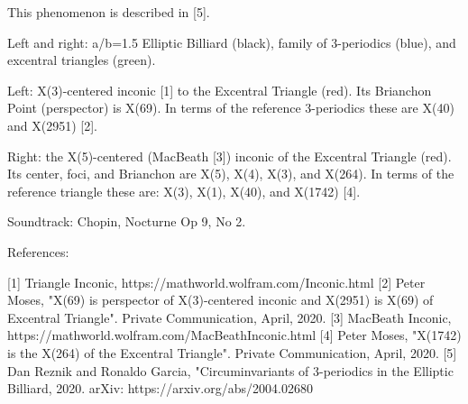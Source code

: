 This phenomenon is described in [5].

Left and right: a/b=1.5 Elliptic Billiard (black), family of 3-periodics (blue), and excentral triangles (green).

Left: X(3)-centered inconic [1] to the Excentral Triangle (red). Its Brianchon Point (perspector) is X(69). In terms of the reference 3-periodics these are X(40) and X(2951) [2].

Right: the X(5)-centered (MacBeath [3]) inconic of the Excentral Triangle (red). Its center, foci, and Brianchon are X(5), X(4), X(3), and X(264). In terms of the reference triangle these are: X(3), X(1), X(40), and X(1742) [4].

Soundtrack: Chopin, Nocturne Op 9, No 2.

References:

[1] Triangle Inconic, https://mathworld.wolfram.com/Inconic.html
[2] Peter Moses, "X(69) is perspector of X(3)-centered inconic and X(2951) is X(69) of Excentral Triangle". Private Communication, April, 2020.
[3] MacBeath Inconic, https://mathworld.wolfram.com/MacBeathInconic.html
[4] Peter Moses, "X(1742) is the X(264) of the Excentral Triangle". Private Communication, April, 2020.
[5] Dan Reznik and Ronaldo Garcia, "Circuminvariants of 3-periodics in the Elliptic Billiard, 2020. arXiv: https://arxiv.org/abs/2004.02680